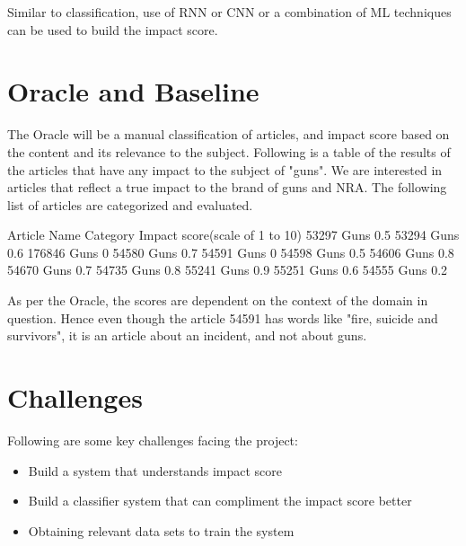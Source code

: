 \documentclass{article}
\begin{document}
Similar to classification, use of RNN or CNN or a combination of ML techniques can be used to build the impact score.

\section*{Oracle and Baseline} %

The Oracle will be a manual classification of articles, and impact score based on the content and its relevance to the subject.
Following is a table of the results of the articles that have any impact to the subject of "guns".
We are interested in articles that reflect a true impact to the brand of guns and NRA.
The following list of articles are categorized and evaluated.

Article Name    Category    Impact score(scale of 1 to 10)
53297           Guns    0.5
53294           Guns    0.6
176846          Guns        0
54580           Guns      0.7
54591           Guns      0
54598           Guns        0.5
54606           Guns        0.8
54670           Guns        0.7
54735           Guns        0.8
55241           Guns        0.9
55251           Guns        0.6
54555           Guns        0.2

As per the Oracle, the scores are dependent on the context of the domain in question.
Hence even though the article 54591 has words like "fire, suicide and survivors", it is an article about an incident, and not about guns.



\section*{Challenges} %

Following are some key challenges facing the project:
\begin{itemize}
	\item Build a system that understands impact score
	\item Build a classifier system that can compliment the impact score better
	\item Obtaining relevant data sets to train the system
\end{itemize}
\end{document}
